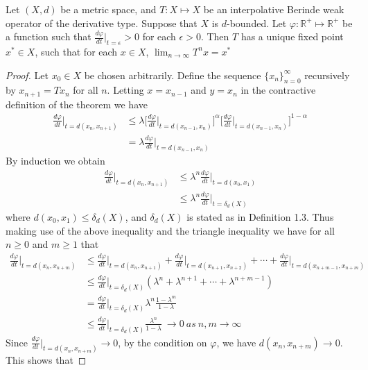 \documentclass[10pt,a4paper]{amsart}
\begin{document}
\begin{thm} Let $(X,d)$ be a metric space, and $T:X\mapsto X$ be an interpolative Berinde weak operator of the derivative type. Suppose that $X$ is $d$-bounded. Let $\varphi: \mathbb{R}^{+}\mapsto \mathbb{R}^{+}$ be a function such that $\frac{d\varphi}{dt}\bigg|_{t=\epsilon} >0$ for each $\epsilon>0$. Then $T$ has a unique fixed point $x^{*}\in X$, such that for each $x\in X$, $\lim_{n\to\infty} T^{n}x=x^{*}$
\end{thm}

\begin{proof} Let $x_0\in X$ be chosen arbitrarily. Define the sequence $\{x_n\}_{n=0}^{\infty}$ recursively by $x_{n+1}=Tx_n$ for all $n$. Letting $x=x_{n-1}$ and $y=x_n$ in the contractive definition of the theorem we have
\begin{align*}
\frac{d\varphi}{dt}\bigg|_{t=d(x_n,x_{n+1})} & \leq \lambda \bigg[\frac{d\varphi}{dt}\bigg|_{t=d(x_{n-1},x_n)}\bigg]^{\alpha} \bigg[\frac{d\varphi}{dt}\bigg|_{t=d(x_{n-1},x_n)}\bigg]^{1-\alpha} \\
&= \lambda \frac{d\varphi}{dt}\bigg|_{t=d(x_{n-1},x_n)}
\end{align*}
By induction we obtain
\begin{align*}
\frac{d\varphi}{dt}\bigg|_{t=d(x_n,x_{n+1})} & \leq \lambda^{n} \frac{d\varphi}{dt}\bigg|_{t=d(x_0,x_1)} \\
& \leq \lambda^{n} \frac{d\varphi}{dt}\bigg|_{t=\delta_d(X)}
\end{align*}
where $d(x_0,x_1)\leq \delta_d(X)$, and $\delta_d(X)$ is stated as in Definition 1.3. Thus making use of the above inequality and the triangle inequality we have for all $n\geq 0$ and $m\geq 1$ that 
\begin{align*}
\frac{d\varphi}{dt}\bigg|_{t=d(x_n,x_{n+m})}&\leq \frac{d\varphi}{dt}\bigg|_{t=d(x_n,x_{n+1})}+\frac{d\varphi}{dt}\bigg|_{t=d(x_{n+1},x_{n+2})}+\cdots+ \frac{d\varphi}{dt}\bigg|_{t=d(x_{n+m-1},x_{n+m})} \\
&\leq \frac{d\varphi}{dt}\bigg|_{t=\delta_d(X)} (\lambda^{n}+\lambda^{n+1}+\cdots+\lambda^{n+m-1})\\
&=\frac{d\varphi}{dt}\bigg|_{t=\delta_d(X)} \lambda ^{n} \frac{1-\lambda^{m}}{1-\lambda}\\
&\leq \frac{d\varphi}{dt}\bigg|_{t=\delta_d(X)} \frac{\lambda^{n}}{1-\lambda}~\rightarrow 0~as~n,m \rightarrow \infty
\end{align*}
Since $\frac{d\varphi}{dt}\bigg|_{t=d(x_n,x_{n+m})} \rightarrow 0$, by the condition on $\varphi$, we have $d(x_n,x_{n+m})\rightarrow 0$. This shows that

\end{proof}
\end{document}
